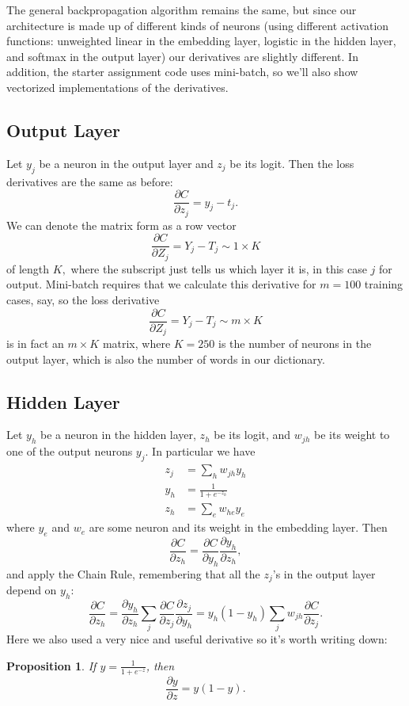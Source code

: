 \documentclass[12pt]{article}
\theoremstyle{plain}
\newtheorem{proposition}[theorem]{Proposition}
\theoremstyle{definition}
\theoremstyle{remark}
\begin{document}
The general backpropagation algorithm remains the same, but since our architecture is made up of different kinds of neurons (using different activation functions: unweighted linear in the embedding layer, logistic in the hidden layer, and softmax in the output layer) our derivatives are slightly different. In addition, the starter assignment code uses mini-batch, so we'll also show vectorized implementations of the derivatives.

\subsection{Output Layer}

Let $y_j$ be a neuron in the output layer and $z_j$ be its logit. Then the loss derivatives are the same as before:
$$\frac{\partial C}{\partial z_j} = y_j - t_j.$$
We can denote the matrix form as a row vector
$$\frac{\partial C}{\partial Z_j} = Y_j - T_j \sim 1 \times K$$
of length $K,$ where the subscript just tells us which layer it is, in this case $j$ for output. Mini-batch requires that we calculate this derivative for $m = 100$ training cases, say, so the loss derivative 
$$\frac{\partial C}{\partial Z_j} = Y_j - T_j \sim m \times K$$ 
is in fact an $m \times K$ matrix, where $K = 250$ is the number of neurons in the output layer, which is also the number of words in our dictionary.

\subsection{Hidden Layer}

Let $y_h$ be a neuron in the hidden layer, $z_h$ be its logit, and $w_{jh}$ be its weight to one of the output neurons $y_j$. In particular we have
\begin{align*}
z_j &= \sum_h w_{jh} y_h\\
y_h &= \frac{1}{1 + e^{-z_h}}\\
z_h &= \sum_e w_{he} y_e
\end{align*}
where $y_e$ and $w_e$ are some neuron and its weight in the embedding layer. Then
$$\frac{\partial C}{\partial z_h} = \frac{\partial C}{\partial y_h} \frac{\partial y_h}{\partial z_h},$$
and apply the Chain Rule, remembering that all the $z_j$'s in the output layer depend on $y_h$:
$$\frac{\partial C}{\partial z_h} = \frac{\partial y_h}{\partial z_h} \sum_j \frac{\partial C}{\partial z_j} \frac{\partial z_j}{\partial y_h} = y_h (1 - y_h) \sum_j w_{jh} \frac{\partial C}{\partial z_j}.$$ Here we also used a very nice and useful derivative so it's worth writing down:
\begin{mdframed}
\begin{proposition}
If $y = \frac{1}{1 + e^{-z}}$, then $$\frac{\partial y}{\partial z} = y (1 - y).$$
\end{proposition}
\end{mdframed}
\end{document}

